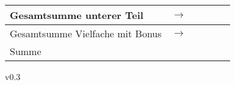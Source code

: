 \documentclass[a4paper,11pt]{exam}
\begin{document}
\begin{table}[h]
\begin{tabular}{|l|l|l|l|l|l|}
    \hline\hline
    Gesamtsumme unterer Teil       & $\longrightarrow$                                 &         &         &         &         \\
    \hline
    Gesamtsumme Vielfache mit Bonus & $\longrightarrow$                                 &         &         &         &         \\
    \hline\hline
    Summe                     &                                                   &         &         &         &         \\
    \hline
\end{tabular}
\end{table}

\vfill
\small{v0.3}
\end{document}
